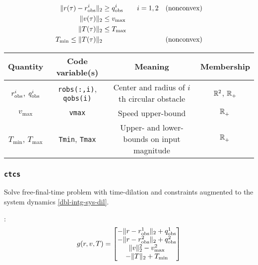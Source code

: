 \documentclass[11pt,a4paper]{article}
\begin{document}
\begin{align*}
    \|r(\tau) - r_{\mathrm{obs}}^i\|_2 \ge{} & q_{\mathrm{obs}}^i \qquad i=1,2 & & \text{(nonconvex)}\\
    \|v(\tau)\|_2 \le{} & v_{\max} & & \\
    \|T(\tau)\|_2 \le{} & T_{\max} & & \\
    T_{\min} \le \|T(\tau)\|_2 ~~~~ &  & & \text{(nonconvex)}
\end{align*}

\begin{center}
\begin{tabular}{c|c|c|c}
\hline
Quantity & Code variable(s) & Meaning & Membership \\
\hline
$r^i_{\mathrm{obs}}$, $q^i_{\mathrm{obs}}$ & \verb|robs(:,i)|, \verb|qobs(i)| & Center and radius of $i$th circular obstacle & $\mathbb{R}^{2}$, $\mathbb{R}^{}_+$\\
$v_{\max}$ & \verb|vmax| & Speed upper-bound & $\mathbb{R}^{}_+$\\
$T_{\min}$, $T_{\max}$ & \verb|Tmin|, \verb|Tmax| & Upper- and lower-bounds on input magnitude & $\mathbb{R}^{}_+$
\end{tabular}
\end{center}

\subsubsection{\texttt{ctcs}}

Solve free-final-time problem with time-dilation and constraints augmented to the system dynamics \eqref{dbl-intg-sys-dil}.

:
\begin{align*}
    g(r,v,T) = \begin{bmatrix}
                  -\|r - r^1_{\mathrm{obs}}\|_2 + q^1_{\mathrm{obs}} \\
                  -\|r - r^2_{\mathrm{obs}}\|_2 + q^2_{\mathrm{obs}} \\
                   \|v\|_2^2 - v_{\max}^2 \\
                  -\|T\|_2 + T_{\min}
               \end{bmatrix}
\end{align*}

\end{document}
